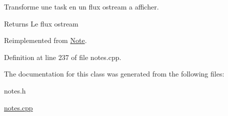 Transforme une task en un flux ostream a afficher. 

\begin{DoxyReturn}{Returns}
Le flux ostream 
\end{DoxyReturn}


Reimplemented from \hyperlink{class_note_a1bd4acfbde0b71d05fd7d4ca889bca2b}{Note}.



Definition at line 237 of file notes.\+cpp.



The documentation for this class was generated from the following files\+:\begin{DoxyCompactItemize}
\item 
notes.\+h\item 
\hyperlink{notes_8cpp}{notes.\+cpp}\end{DoxyCompactItemize}
